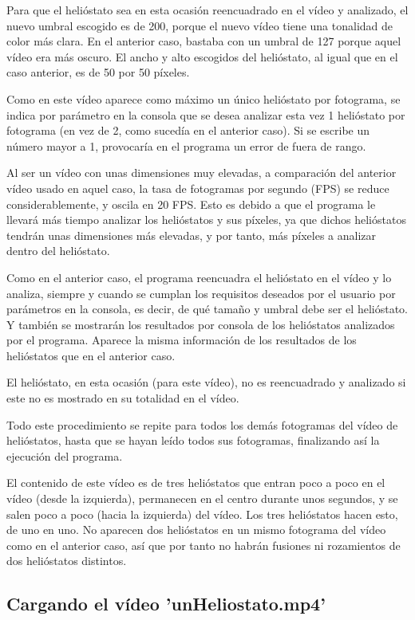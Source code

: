 Para que el helióstato sea en esta ocasión reencuadrado en el vídeo y analizado, el nuevo umbral escogido es de 200, porque el nuevo vídeo tiene una tonalidad de color más clara. En el anterior caso, bastaba con un umbral de 127 porque aquel vídeo era más oscuro. El ancho y alto escogidos del helióstato, al igual que en el caso anterior, es de 50 por 50 píxeles.

Como en este vídeo aparece como máximo un único helióstato por fotograma, se indica por parámetro en la consola que se desea analizar esta vez 1 helióstato por fotograma (en vez de 2, como sucedía en el anterior caso). Si se escribe un número mayor a 1, provocaría en el programa un error de fuera de rango.

Al ser un vídeo con unas dimensiones muy elevadas, a comparación del anterior vídeo usado en aquel caso, la tasa de fotogramas por segundo (FPS) se reduce considerablemente, y oscila en 20 FPS. Esto es debido a que el programa le llevará más tiempo analizar los helióstatos y sus píxeles, ya que dichos helióstatos tendrán unas dimensiones más elevadas, y por tanto, más píxeles a analizar dentro del helióstato.

Como en el anterior caso, el programa reencuadra el helióstato en el vídeo y lo analiza, siempre y cuando se cumplan los requisitos deseados por el usuario por parámetros en la consola, es decir, de qué tamaño y umbral debe ser el helióstato. Y también se mostrarán los resultados por consola de los helióstatos analizados por el programa. Aparece la misma información de los resultados de los helióstatos que en el anterior caso.

El helióstato, en esta ocasión (para este vídeo), no es reencuadrado y analizado si este no es mostrado en su totalidad en el vídeo.

Todo este procedimiento se repite para todos los demás fotogramas del vídeo de helióstatos, hasta que se hayan leído todos sus fotogramas, finalizando así la ejecución del programa.

El contenido de este vídeo es de tres helióstatos que entran poco a poco en el vídeo (desde la izquierda), permanecen en el centro durante unos segundos, y se salen poco a poco (hacia la izquierda) del vídeo. Los tres helióstatos hacen esto, de uno en uno. No aparecen dos helióstatos en un mismo fotograma del vídeo como en el anterior caso, así que por tanto no habrán fusiones ni rozamientos de dos helióstatos distintos.

\subsection{Cargando el vídeo 'unHeliostato.mp4'}

